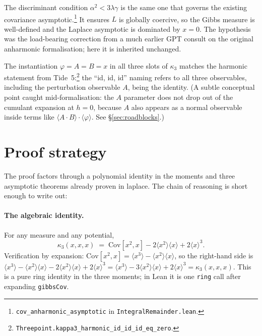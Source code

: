 \documentclass[11pt]{article}
\begin{document}
The discriminant condition $\alpha^2 < 3\lambda\gamma$ is the same one
that governs the existing covariance
asymptotic.\footnote{\texttt{cov\_anharmonic\_asymptotic} in
\texttt{IntegralRemainder.lean}.} It ensures $L$ is globally coercive,
so the Gibbs measure is well-defined and the Laplace asymptotic is
dominated by $x = 0$. The hypothesis was the load-bearing correction
from a much earlier GPT consult on the original anharmonic
formalisation; here it is inherited unchanged.

The instantiation $\varphi = A = B = x$ in all three slots of $\kappa_3$
matches the harmonic statement from
Tide~5:\footnote{\texttt{Threepoint.kappa3\_harmonic\_id\_id\_id\_eq\_zero}.}
the ``id, id, id'' naming refers to all three observables, including
the perturbation observable $A$, being the identity. (A subtle
conceptual point caught mid-formalisation: the $A$ parameter does not
drop out of the cumulant expansion at $h = 0$, because $A$ also appears
as a normal observable inside terms like $\langle A \cdot B \rangle \cdot \langle \varphi \rangle$.
See \S\ref{sec:roadblocks}.)

\section{Proof strategy}\label{sec:strategy}

The proof factors through a polynomial identity in the moments and
three asymptotic theorems already proven in laplace. The chain of
reasoning is short enough to write out:

\paragraph{The algebraic identity.} For any measure and any potential,
\[
  \kappa_3(x, x, x)
  \;=\; \mathrm{Cov}[x^2, x] - 2 \langle x^2 \rangle \langle x \rangle + 2 \langle x \rangle^3.
\]
Verification by expansion: $\mathrm{Cov}[x^2, x] = \langle x^3 \rangle - \langle x^2 \rangle \langle x \rangle$,
so the right-hand side is
$\langle x^3 \rangle - \langle x^2 \rangle \langle x \rangle - 2 \langle x^2 \rangle \langle x \rangle + 2 \langle x \rangle^3
= \langle x^3 \rangle - 3 \langle x^2 \rangle \langle x \rangle + 2 \langle x \rangle^3 = \kappa_3(x, x, x)$.
This is a pure ring identity in the three moments; in Lean it is one
\texttt{ring} call after expanding \texttt{gibbsCov}.
\end{document}
